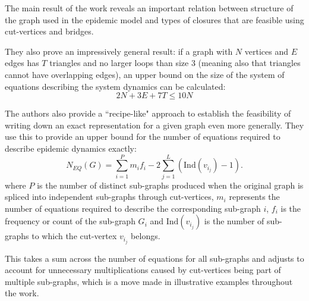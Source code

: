 \documentclass[../report.tex]{subfiles}
\begin{document}
The main result of the work reveals an important relation between structure of the graph used in the epidemic model and types of closures that are feasible using cut-vertices and bridges.

They also prove an impressively general result: if a graph with $N$ vertices and  $E$ edges has $T$ triangles and no larger loops than size 3 (meaning also that triangles cannot have overlapping edges), an upper bound on the size of the system of equations describing the system dynamics can be calculated:
$$
2N + 3E + 7T \leq 10N
$$

The authors also provide a ``recipe-like" approach to establish the feasibility of writing down an exact representation for a given graph even more generally. They use this to provide an upper bound for the number of equations required to describe epidemic dynamics exactly:
$$
\displaystyle N_{EQ}(G)=\sum^P_{i=1}m_if_i - 2\sum^{L}_{j=1}(\text{Ind}(v_{i_j})-1).
$$
where $P$ is the number of distinct sub-graphs produced when the original graph is spliced into independent sub-graphs through cut-vertices, $m_i$ represents the number of equations required to describe the corresponding sub-graph $i$, $f_i$ is the frequency or count of the sub-graph $G_i$ and $\text{Ind}(v_{i_j})$ is the number of sub-graphs to which the cut-vertex $v_{i_j}$ belongs.

This takes a sum across the number of equations for all sub-graphs and adjusts to account for unnecessary multiplications caused by cut-vertices being part of multiple sub-graphs, which is a move made in illustrative examples throughout the work.
\end{document}
